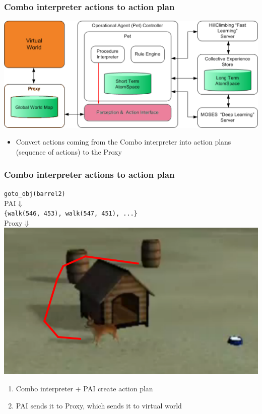 \documentclass{beamer}
\begin{document}
\frame
{
  \frametitle{Combo interpreter actions to action plan}

  \begin{center}
    \includegraphics[scale=0.1]{Embodiment_Interpreter_PAI.png}
  \end{center}

  \begin{itemize}
  \item<+-> Convert actions coming from the \alert{Combo interpreter into action
    plans} (sequence of actions) to the Proxy
  \end{itemize}
}

\frame
{
  
  \frametitle{Combo interpreter actions to action plan}
  \begin{center}
    {\tt goto\_obj(barrel2)}\\
    PAI$\Downarrow$\\
    {\tt \{walk(546, 453), walk(547, 451), ...\}}\\
    Proxy$\Downarrow$\\
    
    \includegraphics[scale=0.23]{goto_barrel.png}
  \end{center}

  \begin{enumerate}
    \item Combo interpreter + PAI create action plan
    \item PAI sends it to Proxy, which sends it to virtual world
    \end{enumerate}

}
\end{document}
